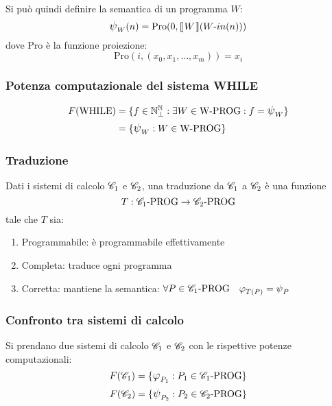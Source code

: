 Si può quindi definire la semantica di un programma $W$:
$$\semanticaWHILE_W(n) = \text{Pro}(0,\opsemWHILE{W}{\text{$W$-$in$}(n)})$$
dove Pro è la funzione proiezione:
$$ \text{Pro}(i,(x_0,x_1,\dots,x_m)) = x_i $$

\subsubsection*{Potenza computazionale del sistema WHILE}
$$ \begin{aligned}
    F(\text{WHILE}) &= \{ f\in\N^\N_\perp : \exists W\in \text{W-PROG}:f=\semanticaWHILE_W \}\\
    &= \{ \semanticaWHILE_W : W \in \text{W-PROG} \} 
    \end{aligned}
$$

\subsubsection{Traduzione}
Dati i sistemi di calcolo $\mathscr{C}_1$ e $\mathscr{C}_2$, una traduzione da $\mathscr{C}_1$ a $\mathscr{C}_2$ è una funzione
$$ T:\mathscr{C}_1\text{-PROG}\to\mathscr{C}_2\text{-PROG} $$
tale che $T$ sia:
\begin{enumerate}
    \item Programmabile: è programmabile effettivamente
    \item Completa: traduce ogni programma
    \item Corretta: mantiene la semantica:
        $\forall P\in\SC_1\text{-PROG} \quad \semanticaRAM_{T(P)}=\semanticaWHILE_{P}$
\end{enumerate}
\subsubsection{Confronto tra sistemi di calcolo}
Si prendano due sistemi di calcolo $\mathscr{C}_1$ e $\mathscr{C}_2$ con le rispettive potenze computazionali:
$$ F(\SC_1) = \{\semanticaRAM_{P_1}:P_1\in\SC_1\text{-PROG}\} $$
$$ F(\SC_2) = \{\semanticaWHILE_{P_2}:P_2\in\SC_2\text{-PROG}\} $$

